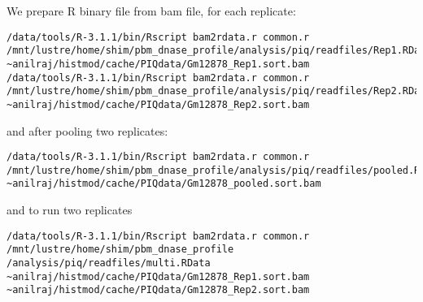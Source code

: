 \documentclass[11pt]{article}
\begin{document}
We prepare R binary file from bam file, for each replicate:
\begin{lstlisting}
/data/tools/R-3.1.1/bin/Rscript bam2rdata.r common.r /mnt/lustre/home/shim/pbm_dnase_profile/analysis/piq/readfiles/Rep1.RData ~anilraj/histmod/cache/PIQdata/Gm12878_Rep1.sort.bam
/data/tools/R-3.1.1/bin/Rscript bam2rdata.r common.r /mnt/lustre/home/shim/pbm_dnase_profile/analysis/piq/readfiles/Rep2.RData ~anilraj/histmod/cache/PIQdata/Gm12878_Rep2.sort.bam
\end{lstlisting}
and after pooling two replicates:
\begin{lstlisting}
/data/tools/R-3.1.1/bin/Rscript bam2rdata.r common.r /mnt/lustre/home/shim/pbm_dnase_profile/analysis/piq/readfiles/pooled.RData ~anilraj/histmod/cache/PIQdata/Gm12878_pooled.sort.bam
\end{lstlisting}
and to run two replicates
\begin{lstlisting}
/data/tools/R-3.1.1/bin/Rscript bam2rdata.r common.r /mnt/lustre/home/shim/pbm_dnase_profile
/analysis/piq/readfiles/multi.RData ~anilraj/histmod/cache/PIQdata/Gm12878_Rep1.sort.bam ~anilraj/histmod/cache/PIQdata/Gm12878_Rep2.sort.bam
\end{lstlisting}
\end{document}
